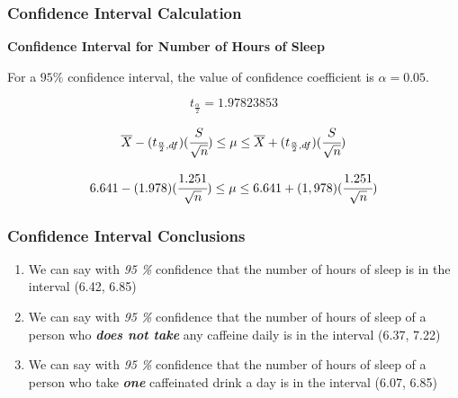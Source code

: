 \documentclass[11pt,]{beamer}
\begin{document}
\begin{frame}

    \frametitle{Confidence Interval Calculation}
    
        \textbf{Confidence Interval for Number of Hours of Sleep}
        
        For a $95 \%$ confidence interval, the value of confidence coefficient is $\alpha = 0.05$. 
        
        \begin{equation}
            t_{\frac{\alpha}{2}} = 1.97823853 
        \end{equation}
        
        \begin{equation}
            \overline{X} - (t_{\frac{\alpha}{2}, df})(\cfrac{S}{\sqrt{n}}) \leq \mu \leq \overline{X} + (t_{\frac{\alpha}{2}, df})(\cfrac{S}{\sqrt{n}})
        \end{equation}
        
        \begin{equation}
            6.641 - (1.978)(\cfrac{1.251}{\sqrt{n}}) \leq \mu \leq 6.641 + (1,978)(\cfrac{1.251}{\sqrt{n}})
        \end{equation}
    
\end{frame}

\begin{frame}

	\frametitle{Confidence Interval Conclusions}

    \begin{enumerate}
        
        \item{We can say with \textit{95 \%} confidence that the number of hours of sleep is in the interval (6.42, 6.85)}
        
        \bigskip
        
        \item{We can say with \textit{95 \%} confidence that the number of hours of sleep of a person who \emph{\textbf{does not take}} any caffeine daily is in the interval (6.37, 7.22)}
        
        \bigskip
        
        \item{We can say with \textit{95 \%} confidence that the number of hours of sleep of a person who take \emph{\textbf{one}} caffeinated drink a day is in the interval (6.07, 6.85)}
        
    \end{enumerate}
    
\end{frame}
\end{document}

